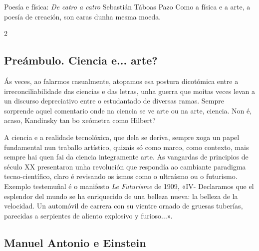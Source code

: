 \Artigo*%
{divulgacion}%
{Poesía e física: \textit{De catro a catro}}%
{Sebastián Táboas Pazo}%
{Como a física e a arte, a poesía de creación, son caras dunha mesma moeda.}%

\begin{multicols}{2}



\subsection*{Preámbulo. Ciencia e... arte?}

Ás veces, ao falarmos casualmente, atopamos esa postura dicotómica entre a
irreconciliabilidade das ciencias e das letras, unha guerra que moitas veces
levan a un discurso depreciativo entre o estudantado de diversas ramas. Sempre
sorprende aquel comentario onde na ciencia se ve arte ou na arte, ciencia. Non
é, acaso, Kandinsky tan bo xeómetra como Hilbert? %

A ciencia e a realidade tecnolóxica, que dela se deriva, sempre xoga un papel
fundamental nun traballo artístico, quizais só como marco, como contexto, mais
sempre hai quen fai da ciencia integramente arte. As vangardas de principios de
século XX presentaron unha revolución que respondía ao cambiante paradigma
tecno-científico, claro é revisando os ismos como o ultraísmo ou o futurismo.
Exemplo testemuñal é o manifesto \textit{Le Futurisme} \cite{futurismo} de
1909, «IV- Declaramos que el esplendor del mundo se ha enriquecido de
una belleza nueva: la belleza de la velocidad. Un automóvil de carrera con su
vientre ornado de gruesas tuberías, parecidas a serpientes de aliento explosivo
y furioso...».


\subsection*{Manuel Antonio e Einstein}


\end{multicols}
